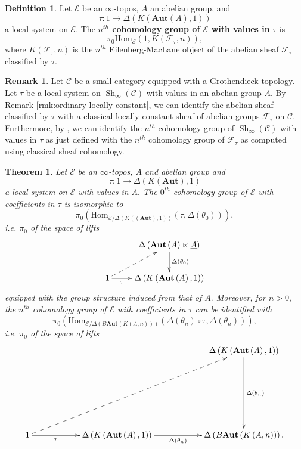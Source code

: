 \documentclass[12pt]{amsart}
\newtheorem{theorem}[dummy]{Theorem}
\theoremstyle{definition}
\newtheorem{definition}[dummy]{Definition}
\newtheorem{remark}[dummy]{Remark}
\newcommand{\cE}{\mathcal{E}}
\newcommand{\cF}{\mathcal{F}}
\newcommand{\sC}{\mathscr{C}}
\newcommand{\Sh}{\operatorname{Sh}}
\newcommand{\Hom}{\mathrm{Hom}}
\renewcommand{\i}{\infty}
\def\Shi{\Sh_\i}
\def\Aut{\mathbf{Aut}}
\begin{document}
\begin{definition}
Let $\cE$ be an $\i$-topos, $A$ an abelian group, and $$\tau:1 \to \Delta\left(K\left(\Aut\left(A\right),1\right)\right)$$ a local system on $\cE.$ The \textbf{$n^{th}$  cohomology group of $\cE$ with values in $\tau$} is $$\pi_0\Hom_{\cE}\left(1,K\left(\cF_{\tau},n\right)\right),$$ where $K\left(\cF_{\tau},n\right)$ is the $n^{th}$ Eilenberg-MacLane object of the abelian sheaf $\cF_{\tau}$ classified by $\tau.$
\end{definition}

\begin{remark}
Let $\sC$ be a small category equipped with a Grothendieck topology. Let $\tau$ be a local system on $\Shi\left(\sC\right)$ with values in an abelian group $A.$ By Remark \ref{rmk:ordinary locally constant}, we can identify the abelian sheaf classified by $\tau$ with a classical locally constant sheaf of abelian groups $\cF_{\tau}$ on $\sC.$ Furthermore, by \cite[Remark 7.2.2.17]{htt}, we can identify the $n^{th}$ cohomology group of $\Shi\left(\sC\right)$ with values in $\tau$ as just defined with the $n^{th}$ cohomology group of $\cF_{\tau}$ as computed using classical sheaf cohomology.
\end{remark}

\begin{theorem}\label{thm: classifying space infinity topos}
Let $\cE$ be an $\i$-topos, $A$ and abelian group and $$\tau:1 \to \Delta\left(K\left(\Aut\right),1\right)$$ a local system on $\cE$ with values in $A.$ The $0^{th}$ cohomology group of $\cE$ with coefficients in $\tau$ is isomorphic to 
$$\pi_0\left(\Hom_{\cE/\Delta\left(K\left(\left(\Aut\right),1\right)\right)}\left(\tau,\Delta\left(\theta_0\right)\right)\right),$$
i.e. $\pi_0$ of the space of lifts
$$\xymatrix{ & \Delta\left(\Aut\left(A\right) \ltimes \underline{A}\right) \ar[d]^-{\Delta\left(\theta_0\right)}\\
1 \ar[r]_-{\tau} \ar@{-->}[ru] & \Delta\left(K\left(\Aut\left(A\right),1\right)\right)}$$
equipped with the group structure induced from that of $A.$ Moreover, for $n>0,$ the $n^{th}$ cohomology group of $\cE$ with coefficients in $\tau$ can be identified with
$$\pi_0\left(\Hom_{\cE/\Delta\left(B\Aut\left(K\left(A,n\right)\right)\right)}\left(\Delta\left(\theta_n\right) \circ \tau,\Delta\left(\theta_n\right)\right)\right),$$
i.e. $\pi_0$ of the space of lifts
$$\xymatrix@R=3cm@C=2cm{ & & \Delta\left(K\left(\Aut\left(A\right),1\right)\right) \ar[d]^-{\Delta\left(\theta_n\right)}\\
1 \ar[r]_-{\tau} \ar@{-->}[rru] & \Delta\left(K\left(\Aut\left(A\right),1\right)\right) \ar[r]_-{\Delta\left(\theta_n\right)} & \Delta\left(B\Aut\left(K\left(A,n\right)\right)\right).}$$
\end{theorem}
\end{document}
